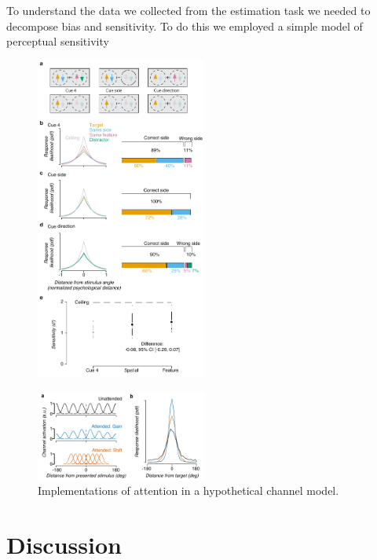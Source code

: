 To understand the data we collected from the estimation task we needed to decompose bias and sensitivity. To do this we employed a simple model of perceptual sensitivity 

\begin{figure}
\centering
\includegraphics[keepaspectratio,width=0.5\textwidth]{figs_c4/f4b_estimation_perf.pdf}
\caption[Estimation task performance]{}
\label{fig:c4f6}
\end{figure}

\begin{figure}
\centering
\includegraphics[keepaspectratio,width=0.5\textwidth]{figs_c4/f5_channel_attention.pdf}
\caption[Attention in a channel model]{Implementations of attention in a hypothetical channel model. }
\label{fig:c4f7}
\end{figure}

\section{Discussion}


